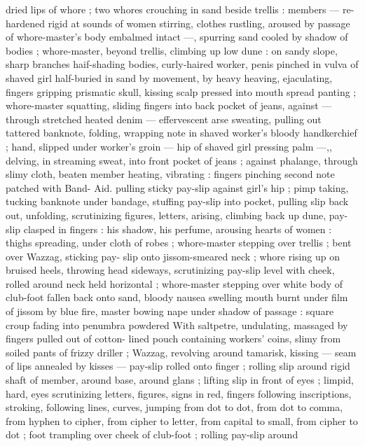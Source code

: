 dried lips of whore ; two whores crouching in sand beside trellis : 
members --- re-hardened rigid at sounds of women stirring, clothes 
rustling, aroused by passage of whore-master's body embalmed 
intact ---, spurring sand cooled by shadow of bodies ; whore-master, 
beyond trellis, climbing up low dune : on sandy slope, sharp 
branches haif-shading bodies, curly-haired worker, penis pinched in 
vulva of shaved girl half-buried in sand by movement, by heavy 
heaving, ejaculating, fingers gripping prismatic skull, kissing scalp 
pressed into mouth spread panting ; whore-master squatting, sliding 
fingers into back pocket of jeans, against --- through stretched 
heated denim --- effervescent arse sweating, pulling out tattered 
banknote, folding, wrapping note in shaved worker's bloody 
handkerchief ; hand, slipped under worker's groin --- hip of shaved 
girl pressing palm ---,, delving, in streaming sweat, into front pocket 
of jeans ; against phalange, through slimy cloth, beaten member 
heating, vibrating : fingers pinching second note patched with Band- 
Aid. pulling sticky pay-slip against girl's hip ; pimp taking, tucking 
banknote under bandage, stuffing pay-slip into pocket, pulling slip 
back out, unfolding, scrutinizing figures, letters, arising, climbing 
back up dune, pay-slip clasped in fingers : his shadow, his perfume, 
arousing hearts of women : thighs spreading, under cloth of robes ; 
whore-master stepping over trellis ; bent over Wazzag, sticking pay- 
slip onto jissom-smeared neck ; whore rising up on bruised heels, 
throwing head sideways, scrutinizing pay-slip level with cheek, rolled 
around neck held horizontal ; whore-master stepping over white body 
of club-foot fallen back onto sand, bloody nausea swelling mouth 
burnt under film of jissom by blue fire, master bowing nape under 
shadow of passage : square croup fading into penumbra powdered 
With saltpetre, undulating, massaged by fingers pulled out of cotton- 
lined pouch containing workers' coins, slimy from soiled pants of 
frizzy driller ; Wazzag, revolving around tamarisk, kissing --- seam of 
lips annealed by kisses --- pay-slip rolled onto finger ; rolling slip 
around rigid shaft of member, around base, around glans ; lifting slip 
in front of eyes ; limpid, hard, eyes scrutinizing letters, figures, signs 
in red, fingers following inscriptions, stroking, following lines, 
curves, jumping from dot to dot, from dot to comma, from hyphen to 
cipher, from cipher to letter, from capital to small, from cipher to dot 
; foot trampling over cheek of club-foot ; rolling pay-slip around 
